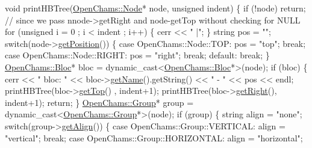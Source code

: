 \begin{DoxyCodeInclude}
\textcolor{keywordtype}{void} printHBTree(\mbox{\hyperlink{class_open_chams_1_1_node}{OpenChams::Node}}* node, \textcolor{keywordtype}{unsigned} indent) \{
    \textcolor{keywordflow}{if} (!node) \textcolor{keywordflow}{return}; \textcolor{comment}{// since we pass nnode->getRight and node-getTop without checking for NULL}
    \textcolor{keywordflow}{for} (\textcolor{keywordtype}{unsigned} i = 0 ; i < indent ; i++) \{
        cerr << \textcolor{stringliteral}{" |"};
    \}
    \textcolor{keywordtype}{string} pos = \textcolor{stringliteral}{""};
    \textcolor{keywordflow}{switch}(node->\mbox{\hyperlink{class_open_chams_1_1_node_a566f4d0bebb46cfd31384a8394a7dbb9}{getPosition}}()) \{
        \textcolor{keywordflow}{case} OpenChams::Node::TOP:
            pos = \textcolor{stringliteral}{"top"};
            \textcolor{keywordflow}{break};
        \textcolor{keywordflow}{case} OpenChams::Node::RIGHT:
            pos = \textcolor{stringliteral}{"right"};
            \textcolor{keywordflow}{break};
        \textcolor{keywordflow}{default}:
            \textcolor{keywordflow}{break};
    \}
    \mbox{\hyperlink{class_open_chams_1_1_bloc}{OpenChams::Bloc}}* bloc = \textcolor{keyword}{dynamic\_cast<}\mbox{\hyperlink{class_open_chams_1_1_bloc}{OpenChams::Bloc}}*\textcolor{keyword}{>}(node);
    \textcolor{keywordflow}{if} (bloc) \{
        cerr << \textcolor{stringliteral}{" bloc: "} << bloc->\mbox{\hyperlink{class_open_chams_1_1_node_a3fd7335faa33dce2f87c7e50eef3e294}{getName}}().getString() << \textcolor{stringliteral}{" - "} << pos << endl;
        printHBTree(bloc->\mbox{\hyperlink{class_open_chams_1_1_node_af59967a8c2d5a04ca0a58e2ef29bead1}{getTop}}()  , indent+1);
        printHBTree(bloc->\mbox{\hyperlink{class_open_chams_1_1_node_a9533ddcf078ddfc2a4e9bd9ffafa51cb}{getRight}}(), indent+1);
        \textcolor{keywordflow}{return};
    \}
    \mbox{\hyperlink{class_open_chams_1_1_group}{OpenChams::Group}}* group = \textcolor{keyword}{dynamic\_cast<}\mbox{\hyperlink{class_open_chams_1_1_group}{OpenChams::Group}}*\textcolor{keyword}{>}(node);
    \textcolor{keywordflow}{if} (group) \{
        \textcolor{keywordtype}{string} align = \textcolor{stringliteral}{"none"};
        \textcolor{keywordflow}{switch}(group->\mbox{\hyperlink{class_open_chams_1_1_group_a7cff0c4a6957f23fb1ea4598f4b8a0b8}{getAlign}}()) \{
            \textcolor{keywordflow}{case} OpenChams::Group::VERTICAL:
                align = \textcolor{stringliteral}{"vertical"};
                \textcolor{keywordflow}{break};
            \textcolor{keywordflow}{case} OpenChams::Group::HORIZONTAL:
                align = \textcolor{stringliteral}{"horizontal"};

\end{DoxyCodeInclude}

